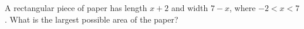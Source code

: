 A rectangular piece of paper has length $x+2$ and width $7-x$, where $-2<x<7$. What is the largest possible area of the paper?
